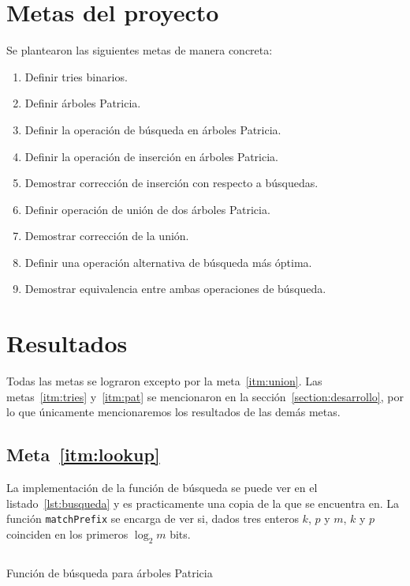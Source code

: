 \documentclass[11pt,letterpaper]{article}
\begin{document}
\section{Metas del proyecto}
\noindent Se plantearon las siguientes metas de manera concreta:
\begin{enumerate}
\item Definir tries binarios. \label{itm:tries}
\item Definir árboles Patricia.\label{itm:pat}
\item Definir la operación de búsqueda en árboles Patricia.\label{itm:lookup}
\item Definir la operación de inserción en árboles Patricia. \label{itm:insert}
\item Demostrar corrección de inserción con respecto a búsquedas.\label{itm:dem1}
\item Definir operación de unión de dos árboles Patricia.\label{itm:defUnion}
\item Demostrar corrección de la unión. \label{itm:union}
\item Definir una operación alternativa de búsqueda más óptima.\label{itm:busqueda2}
\item Demostrar equivalencia entre ambas operaciones de búsqueda.\label{itm:prueba2} 
\end{enumerate}
\section{Resultados}
\noindent Todas las metas se lograron excepto por la meta~\ref{itm:union}. Las metas~\ref{itm:tries} y~\ref{itm:pat} se mencionaron en la sección~\ref{section:desarrollo}, por lo que únicamente mencionaremos los resultados de las demás metas.
\subsection{Meta~\ref{itm:lookup}}
\noindent La implementación de la función de búsqueda se puede ver en el listado~\ref{lst:busqueda} y es practicamente una copia de la que se encuentra en\cite{}. La función \texttt{matchPrefix} se encarga de ver si, dados tres enteros $k$, $p$ y $m$, $k$ y $p$ coinciden en los primeros $\log_2m$ bits.

\begin{listing}[H]
  \inputminted{coq}{src/busqueda.v}
  \caption{Función de búsqueda para árboles Patricia}
  \label{lst:busqueda}
\end{listing}
\end{document}
